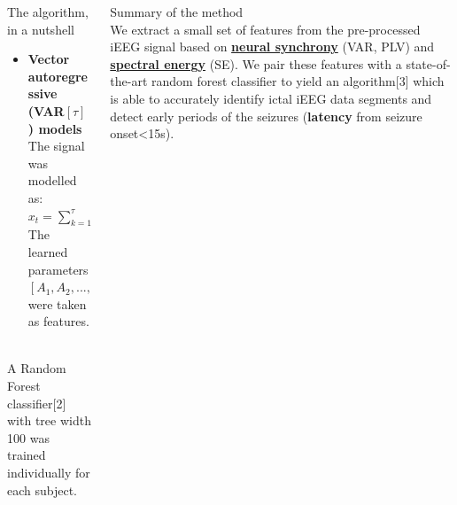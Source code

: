 \documentclass[final,t,overlay, xcolor=table, sans, mathserif]{beamer}
\begin{document}
\begin{frame}{}
\begin{columns}[t]
\begin{column}{.33\linewidth}
\begin{block}{The algorithm, in a nutshell}
\begin{minipage}[t]{0.95\linewidth}
\begin{tcolorbox}[title=2. Feature extraction]
\begin{itemize}
\item {\bf Vector autoregressive (VAR$\left[\tau\right]$) models} \\
The signal was modelled as: \\
$x_{t}=\sum_{k=1}^{\tau}A_{k}x_{t-k}+\epsilon_{t}, \epsilon\sim\mathcal{N}(0,Q)$ \\
The learned parameters $[A_{1},A_{2},...,A_{\tau},Q]$ were taken as features. \\
\qquad \\

\end{itemize}
\end{tcolorbox}
\end{minipage}


\begin{minipage}[t]{0.95\linewidth}
\begin{tcolorbox}[title=3. Clasification]
A Random Forest classifier[2] with tree width 100 was trained individually for each subject.
\end{tcolorbox}
\end{minipage}
\vspace{0.5cm}

\end{block}



\end{column}
\begin{column}{.27\linewidth}


\begin{block}{Summary of the method}
\quad \\
\vspace{0.2cm}
We extract a small set of features from the pre-processed iEEG signal based on \underline{\bf neural synchrony} (VAR, PLV)
and \underline{\bf spectral energy} (SE).
We pair these features with a state-of-the-art random forest classifier to yield an algorithm[3] which
is able to accurately identify ictal iEEG data segments and detect early periods of the seizures
({\bf latency} from seizure onset\textless15s). \\
\qquad \\
\vspace{0.3cm}
\end{block}


\end{column}
\end{columns}
\end{frame}
\end{document}
